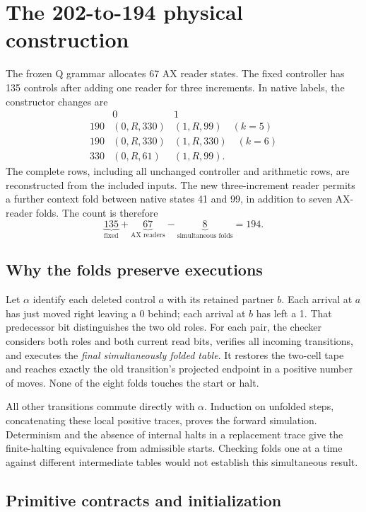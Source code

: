 \documentclass[11pt,letterpaper]{article}
\begin{document}
\section{The 202-to-194 physical construction}
\label{sec:physical}

The frozen Q grammar allocates 67 AX reader states. The fixed controller
has 135 controls after adding one reader for three increments. In native
labels, the constructor changes are
\[
\begin{array}{c|cc}
 &0&1\\\hline
190&(0,R,330)&(1,R,99)\quad(k=5)\\
190&(0,R,330)&(1,R,330)\quad(k=6)\\
330&(0,R,61)&(1,R,99).
\end{array}
\]
The complete rows, including all unchanged controller and arithmetic
rows, are reconstructed from the included inputs. The new three-increment
reader permits a further context fold between native states 41 and 99,
in addition to seven AX-reader folds. The count is therefore
\[
 \underbrace{135}_{\text{fixed}}+
 \underbrace{67}_{\text{AX readers}}-
 \underbrace{8}_{\text{simultaneous folds}}=194.
\]


\subsection{Why the folds preserve executions}

Let $\alpha$ identify each deleted control $a$ with its retained partner
$b$. Each arrival at $a$ has just moved right leaving a 0 behind; each
arrival at $b$ has left a 1. That predecessor bit distinguishes the two
old roles. For each pair, the checker considers both roles and both
current read bits, verifies all incoming transitions, and executes the
\emph{final simultaneously folded table}. It restores the two-cell tape
and reaches exactly the old transition's projected endpoint in a positive
number of moves. None of the eight folds touches the start or halt.

All other transitions commute directly with $\alpha$. Induction on
unfolded steps, concatenating these local positive traces, proves the
forward simulation. Determinism and the absence of internal halts in a
replacement trace give the finite-halting equivalence from admissible
starts. Checking folds one at a time against different intermediate
tables would not establish this simultaneous result.

\subsection{Primitive contracts and initialization}
\end{document}
